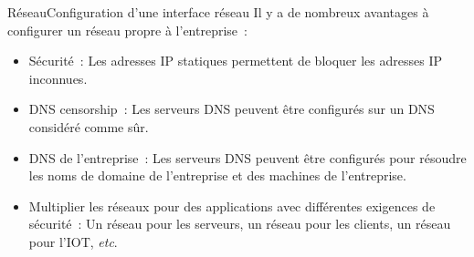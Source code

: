 \documentclass{beamer}
\begin{document}
    \begin{frame}{Réseau}{Configuration d'une interface réseau}
        Il y a de nombreux avantages à configurer un réseau propre à l'entreprise~:
        \begin{itemize}
            \item Sécurité~: Les adresses IP statiques permettent de bloquer les adresses IP inconnues.
            \item DNS censorship~: Les serveurs DNS peuvent être configurés sur un DNS considéré comme sûr.
            \item DNS de l'entreprise~: Les serveurs DNS peuvent être configurés pour résoudre les noms de domaine de l'entreprise et des machines de l'entreprise.
            \item Multiplier les réseaux pour des applications avec différentes exigences de sécurité~: Un réseau pour les serveurs, un réseau pour les clients, un réseau pour l'IOT, \textit{etc}.
        \end{itemize}
    \end{frame}
\end{document}
